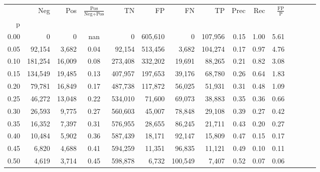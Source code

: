 \begin{tabular}{rrrcrrrrrrrrrrr}
\toprule
{} &      Neg &     Pos & $\frac{\text{Pos}}{\text{Neg}+\text{Pos}}$ &       TN &       FP &       FN &       TP &  Prec &   Rec & $\frac{\text{FP}}{\text{P}}$ \\
p    &          &         &                                            &          &          &          &          &       &       &                              \\
\midrule
0.00 &        0 &       0 &                                        nan &        0 &  605,610 &        0 &  107,956 &  0.15 &  1.00 &                         5.61 \\
0.05 &   92,154 &   3,682 &                                       0.04 &   92,154 &  513,456 &    3,682 &  104,274 &  0.17 &  0.97 &                         4.76 \\
0.10 &  181,254 &  16,009 &                                       0.08 &  273,408 &  332,202 &   19,691 &   88,265 &  0.21 &  0.82 &                         3.08 \\
0.15 &  134,549 &  19,485 &                                       0.13 &  407,957 &  197,653 &   39,176 &   68,780 &  0.26 &  0.64 &                         1.83 \\
0.20 &   79,781 &  16,849 &                                       0.17 &  487,738 &  117,872 &   56,025 &   51,931 &  0.31 &  0.48 &                         1.09 \\
0.25 &   46,272 &  13,048 &                                       0.22 &  534,010 &   71,600 &   69,073 &   38,883 &  0.35 &  0.36 &                         0.66 \\
0.30 &   26,593 &   9,775 &                                       0.27 &  560,603 &   45,007 &   78,848 &   29,108 &  0.39 &  0.27 &                         0.42 \\
0.35 &   16,352 &   7,397 &                                       0.31 &  576,955 &   28,655 &   86,245 &   21,711 &  0.43 &  0.20 &                         0.27 \\
0.40 &   10,484 &   5,902 &                                       0.36 &  587,439 &   18,171 &   92,147 &   15,809 &  0.47 &  0.15 &                         0.17 \\
0.45 &    6,820 &   4,688 &                                       0.41 &  594,259 &   11,351 &   96,835 &   11,121 &  0.49 &  0.10 &                         0.11 \\
0.50 &    4,619 &   3,714 &                                       0.45 &  598,878 &    6,732 &  100,549 &    7,407 &  0.52 &  0.07 &                         0.06 \\

\end{tabular}

